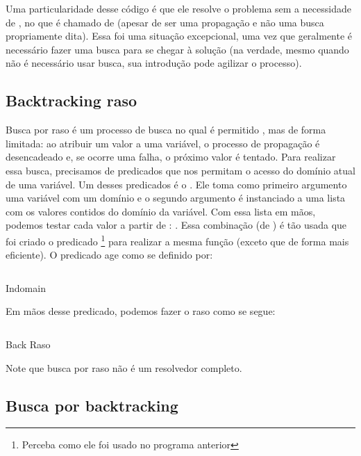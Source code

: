 Uma particularidade desse código é que ele resolve o problema sem a necessidade de
, no que é chamado de  (apesar de ser
uma propagação e não uma busca propriamente dita). Essa foi uma
situação excepcional, uma vez que geralmente é necessário fazer uma busca para se chegar à solução
(na verdade, mesmo quando não é necessário usar busca, sua introdução pode agilizar o processo).

\subsection{Backtracking raso}

Busca por  raso é um processo de busca no qual é permitido
, mas de forma limitada: ao atribuir um valor a uma variável, o processo de
propagação é desencadeado e, se ocorre uma falha, o próximo valor é tentado. Para realizar essa
busca, precisamos de predicados que nos permitam o acesso do domínio atual de uma variável. Um
desses predicados é o . Ele toma como primeiro argumento uma
variável com um domínio e o segundo argumento é instanciado a uma lista com os valores contidos do
domínio da variável. Com essa lista em mãos, podemos testar cada valor a partir de
: . Essa combinação
(de ) é tão usada que foi criado o predicado
\footnote{Perceba como ele foi usado no programa anterior} para realizar a mesma
função (exceto que de forma mais eficiente). O predicado  age como se definido por:

    \begin{listing}[!h]
\inputminted{prolog}{../Exemplos/Cap10/prog2_indomain.pl}
\caption{Indomain}
    \end{listing}

Em mãos desse predicado, podemos fazer o  raso como se segue:

    \begin{listing}[!h]
\inputminted{prolog}{../Exemplos/Cap10/prog3_backraso.ecl}
\caption{Back Raso}
    \end{listing}

Note que busca por  raso não é um resolvedor completo.

\subsection{Busca por backtracking}


